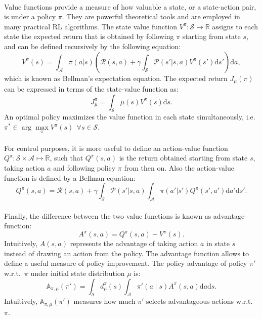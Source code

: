 \paragraph{} %
Value functions provide a measure of how valuable a state, or a state-action pair, is under a policy $\pi$. They are powerful theoretical tools and are employed in many practical \ac{RL} algorithms.
The state value function $V^\pi \colon \mathcal{S} \mapsto \mathbb{R}$ assigns to each state the expected return that is obtained by following $\pi$ starting from state $s$, and can be defined recursively by the following equation:
\[
	V^{\pi}(s) = \int_{\mathcal{A}}\pi(a|s)\left(\mathcal{R}(s,a) + 
		\gamma\int_{\mathcal{S}}\mathcal{P}(s'|s,a)V^{\pi}(s')\mathrm{d}s'\right)\mathrm{d}a,
\]
which is known as Bellman's expectation equation.
The expected return $J_\mu(\pi)$ can be expressed in terms of the state-value function as:
\[
	J_{\mu}^{\pi} = \int_{\mathcal{S}}\mu(s)V^{\pi}(s)\mathrm{d}s.
\]
An optimal policy maximizes the value function in each state simultaneously, i.e.\ $\pi^* \in \arg\max\limits_\pi V^\pi(s) \:\:\forall s \in \mathcal{S}$.
\paragraph{} %
For control purposes, it is more useful to define an action-value function $Q^\pi \colon \mathcal{S} \times \mathcal{A} \mapsto \mathbb{R}$, such that $Q^\pi(s,a)$ is the return obtained starting from state $s$, taking action $a$ and following policy $\pi$ from then on. Also the action-value function is defined by a Bellman equation:
\[
	Q^{\pi}(s,a) = \mathcal{R}(s,a) + \gamma\int_{\mathcal{S}}\mathcal{P}(s'|s,a)
		\int_{\mathcal{A}}\pi(a'|s')Q^{\pi}(s',a')\mathrm{d}a'\mathrm{d}s'.
\]
\paragraph{} %
Finally, the difference between the two value functions is known as advantage function:
\[
	A^{\pi}(s,a) = Q^{\pi}(s,a) - V^{\pi}(s).
\]
Intuitively, $A(s,a)$ represents the advantage of taking action $a$ in state $s$ instead of drawing an action from the policy. The advantage function allows to define a useful measure of policy improvement. The policy advantage of policy $\pi'$ w.r.t.\ $\pi$ under initial state distribution $\mu$ is:
\[
\mathbb{A}_{\pi,\mu}(\pi') = \int_{\mathcal{S}}d_{\mu}^{\pi}(s)\int_{\mathcal{A}}
	\pi'(a \mid s)A^{\pi}(s,a)\mathrm{d}a\mathrm{d}s.
\]
Intuitively, $\mathbb{A}_{\pi,\mu}(\pi')$ measures how much $\pi'$ selects advantageous actions w.r.t.\ $\pi$.


